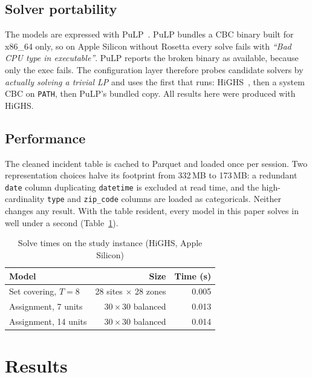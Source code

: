 \documentclass[conference]{IEEEtran}
\begin{document}
\subsection{Solver portability}

The models are expressed with PuLP~\cite{pulp}. PuLP bundles a CBC binary built
for x86\_64 only, so on Apple Silicon without Rosetta every solve fails with
\textit{``Bad CPU type in executable''}. PuLP reports the broken binary as
available, because only the exec fails. The configuration layer therefore probes
candidate solvers by \emph{actually solving a trivial LP} and uses the first that
runs: HiGHS~\cite{highs}, then a system CBC on \texttt{PATH}, then PuLP's
bundled copy. All results here were produced with HiGHS.

\subsection{Performance}

The cleaned incident table is cached to Parquet and loaded once per session.
Two representation choices halve its footprint from 332\,MB to 173\,MB: a
redundant \texttt{date} column duplicating \texttt{datetime} is excluded at read
time, and the high-cardinality \texttt{type} and \texttt{zip\_code} columns are
loaded as categoricals. Neither changes any result. With the table resident,
every model in this paper solves in well under a second
(Table~\ref{tab:runtime}).

\begin{table}[htbp]
\caption{Solve times on the study instance (HiGHS, Apple Silicon)}
\label{tab:runtime}
\centering
\small
\begin{tabular}{@{}lrr@{}}
\toprule
\textbf{Model} & \textbf{Size} & \textbf{Time (s)} \\
\midrule
Set covering, $T=8$      & 28 sites $\times$ 28 zones & 0.005 \\
Assignment, 7 units      & $30 \times 30$ balanced    & 0.013 \\
Assignment, 14 units     & $30 \times 30$ balanced    & 0.014 \\
\bottomrule
\end{tabular}
\end{table}

\section{Results}
\end{document}
